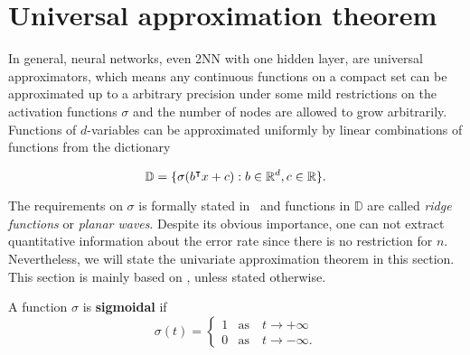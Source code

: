 \section{Universal approximation theorem}
\label{sec:uat}

In general, neural networks, even 2NN with one hidden layer, are universal
approximators, which means any continuous functions on a compact set can be
approximated up to a arbitrary precision under some mild restrictions on the
activation functions $\sigma$ and the number of nodes are allowed to grow
arbitrarily. Functions of $d$-variables can be approximated uniformly by linear
combinations of functions from the dictionary

\begin{equation}
    \label{eq:uat_dict}
    \mathbb{D} = \{\sigma(b{}^{\intercal} x + c): b \in \mathbb{R}^d, c\in \mathbb{R} \}.
\end{equation}

The requirements on $\sigma$ is formally stated
in~\cite{cybenkoApproximationSuperpositionsSigmoidal1989} and functions in
$\mathbb{D}$ are called \textit{ridge functions} or \textit{planar waves}.
Despite its obvious importance, one can not extract quantitative information
about the error rate since there is no restriction for $n$. Nevertheless, we
will state the univariate approximation theorem in this section. This section is
mainly based on \cite{cybenkoApproximationSuperpositionsSigmoidal1989}, unless
stated otherwise.



\begin{definition}\label{def:sigmoidal}
    A function $\sigma$ is \textbf{sigmoidal} if
    \begin{equation}
        \sigma(t) =
        \begin{cases}
            1 & \text{as} \quad t \to +\infty \\
            0 & \text{as} \quad t \to -\infty.
        \end{cases}
    \end{equation}
\end{definition}


